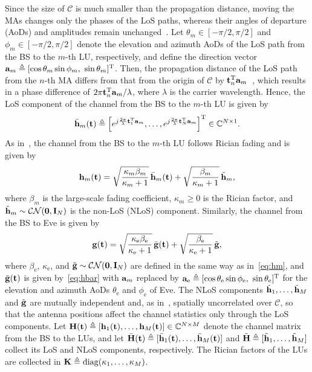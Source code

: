 \documentclass[journal]{IEEEtran}
\begin{document}
Since the size of $\mathcal C$ is much smaller than the propagation distance, moving the MAs changes only the phases of the LoS paths, whereas their angles of departure (AoDs) and amplitudes remain unchanged~\cite{ZhuTWC2024Model}. Let $\theta_m\in[-\pi/2,\pi/2]$ and $\phi_m\in[-\pi/2,\pi/2]$ denote the elevation and azimuth AoDs of the LoS path from the BS to the $m$-th LU, respectively, and define the direction vector $\ba_m\triangleq[\cos\theta_m\sin\phi_m,\ \sin\theta_m]^{\mathrm T}$. Then, the propagation distance of the LoS path from the $n$-th MA differs from that from the origin of $\mathcal C$ by $\mathbf{t}_n^{\mathrm T}\mathbf{a}_m$~\cite{ZhuTWC2024Model}, which results in a phase difference of $2\pi\mathbf{t}_n^{\mathrm T}\mathbf{a}_m/\lambda$, where $\lambda$ is the carrier wavelength. Hence, the LoS component of the channel from the BS to the $m$-th LU is given by~\cite{ZhengTCOM2025}
\begin{equation}\label{eq:hbar}
\bar{\mathbf{h}}_m(\mathbf{t})\triangleq\Big[e^{j\frac{2\pi}{\lambda}\mathbf{t}_1^{\mathrm T}\mathbf{a}_m},\ldots,e^{j\frac{2\pi}{\lambda}\mathbf{t}_N^{\mathrm T}\mathbf{a}_m}\Big]^{\mathrm T}\in\mathbb C^{N\times1}.
\end{equation}
As in~\cite{ZhengTCOM2025,HuTVT2025}, the channel from the BS to the $m$-th LU follows Rician fading and is given by
\begin{equation}\label{eq:hm}
\mathbf{h}_m(\mathbf{t})=\sqrt{\frac{\kappa_m\beta_m}{\kappa_m+1}}\,\bar{\mathbf{h}}_m(\mathbf{t})+\sqrt{\frac{\beta_m}{\kappa_m+1}}\,\tilde{\mathbf{h}}_m,
\end{equation}
where $\beta_m$ is the large-scale fading coefficient, $\kappa_m\ge0$ is the Rician factor, and $\tilde{\mathbf{h}}_m\sim\mathcal{CN}(\mathbf 0,\mathbf{I}_N)$ is the non-LoS (NLoS) component. Similarly, the channel from the BS to Eve is given by
\begin{equation}\label{eq:g}
\mathbf{g}(\mathbf{t})=\sqrt{\frac{\kappa_{\mathrm e}\beta_{\mathrm e}}{\kappa_{\mathrm e}+1}}\,\bar{\mathbf{g}}(\mathbf{t})+\sqrt{\frac{\beta_{\mathrm e}}{\kappa_{\mathrm e}+1}}\,\tilde{\mathbf{g}},
\end{equation}
where $\beta_{\mathrm e}$, $\kappa_{\mathrm e}$, and $\tilde{\mathbf{g}}\sim\mathcal{CN}(\mathbf 0,\mathbf{I}_N)$ are defined in the same way as in~\eqref{eq:hm}, and $\bar{\mathbf{g}}(\mathbf{t})$ is given by~\eqref{eq:hbar} with $\mathbf{a}_m$ replaced by $\mathbf{a}_{\mathrm e}\triangleq[\cos\theta_{\mathrm e}\sin\phi_{\mathrm e},\ \sin\theta_{\mathrm e}]^{\mathrm T}$ for the elevation and azimuth AoDs $\theta_{\mathrm e}$ and $\phi_{\mathrm e}$ of Eve. The NLoS components $\tilde{\mathbf{h}}_1,\ldots,\tilde{\mathbf{h}}_M$ and $\tilde{\mathbf{g}}$ are mutually independent and, as in~\cite{ZhengTCOM2025,HuTVT2025}, spatially uncorrelated over $\mathcal C$, so that the antenna positions affect the channel statistics only through the LoS components. Let $\mathbf{H}(\mathbf{t})\triangleq[\mathbf{h}_1(\mathbf{t}),\ldots,\mathbf{h}_M(\mathbf{t})]\in\mathbb C^{N\times M}$ denote the channel matrix from the BS to the LUs, and let $\bar{\mathbf{H}}(\mathbf{t})\triangleq[\bar{\mathbf{h}}_1(\mathbf{t}),\ldots,\bar{\mathbf{h}}_M(\mathbf{t})]$ and $\tilde{\mathbf{H}}\triangleq[\tilde{\mathbf{h}}_1,\ldots,\tilde{\mathbf{h}}_M]$ collect its LoS and NLoS components, respectively. The Rician factors of the LUs are collected in $\mathbf{K}\triangleq\mathrm{diag}(\kappa_1,\ldots,\kappa_M)$.
\end{document}
